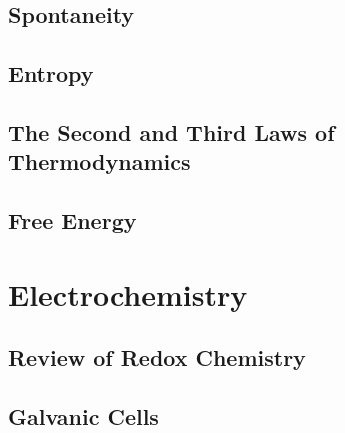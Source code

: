 \documentclass[12pt, openany, letterpaper]{memoir}
\begin{document}
\section{Spontaneity}

\section{Entropy}

\section{The Second and Third Laws of Thermodynamics}

\section{Free Energy}

\chapter{Electrochemistry}

\section{Review of Redox Chemistry}

\section{Galvanic Cells}
\end{document}
